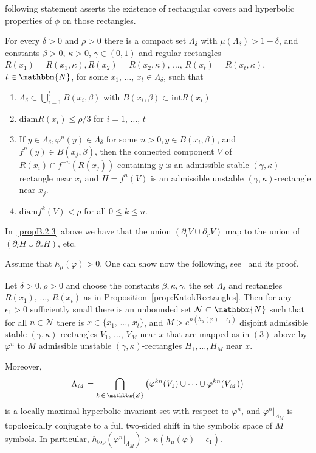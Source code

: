 \documentclass[AHL,Unicode,longabstracts,published]{cedram}
\newcommand{\N}{\mathbbm{N}}
\newcommand{\Z}{\mathbbm{Z}}
\newcommand{\topo}{\mathrm{top}}
\newcommand{\intt}{\mathrm{int}}
\newcommand{\diam}{\mathrm{diam}}
\newcommand{\clN}{\mathcal{N}}
\newcommand{\topo}{\mathrm{top}}
\begin{document}
following statement asserts the existence of rectangular covers and hyperbolic properties of $\phi$ on those rectangles.

\begin{prop}\label{prop:KatokRectangles}
For every $\delta>0$ and $\rho>0$ there is a compact set $\Lambda_{\delta}$ with $\mu(\Lambda_{\delta})>1-\delta$, and constants $\beta>0$, $\kappa>0$, $\gamma\in (0,1)$ and regular rectangles $R(x_1) = R(x_1,\kappa), R(x_2) = R(x_2,\kappa), \,\ldots,\, R(x_t)= R(x_t,\kappa)$, $t\in \N$, for some $x_1, \,\ldots,\, x_t \in \Lambda_{\delta}$, such that
\begin{enumerate}
\item\label{propB.2.1} $\Lambda_{\delta} \subset \bigcup_{i=1}^t B(x_i, \beta)$ with $B(x_i, \beta) \subset {\intt}R(x_i)$
\item \label{propB.2.2}${\diam}R(x_i) \leq \rho/3$ for $i=1, \,\ldots,\, t$
\item\label{propB.2.3} If $y\in \Lambda_{\delta}, \varphi^n(y) \in \Lambda_{\delta}$ for some $n>0, y \in B(x_i, \beta)$, and $f^n(y) \in B(x_j, \beta)$, then the connected component $V$ of $R(x_i)\cap f^{-n}(R(x_j))$ containing $y$ is an admissible stable $(\gamma, \kappa)$-rectangle near $x_i$ and $H= f^n(V)$ is an admissible unstable $(\gamma, \kappa)$-rectangle near $x_j$.
\item\label{propB.2.4} $\diam f^k(V) < \rho$ for all $0\leq k \leq n$.
\end{enumerate}
\end{prop}

In~\eqref{propB.2.3} above we have that the union $(\partial_l V \cup \partial_r V)$ map to the union of $(\partial_l H \cup \partial_r H)$, etc.

Assume that $h_{\mu}(\varphi)>0$. One can show now the following, see~\cite[Theorem~S.5.9]{Hasselblatt-Katok} and its proof.

\begin{prop}\label{prop:KatokHorseshoe}
Let $\delta>0, \rho>0$ and choose the constants $\beta, \kappa, \gamma$, the set $\Lambda_{\delta}$ and rectangles $R(x_1),\, \ldots,\, R(x_t)$ as in Proposition~\ref{prop:KatokRectangles}. Then for any $\epsilon_1>0$ sufficiently small there is an unbounded set $\clN \subset \N$ such that for all $n\in \clN$ there is $x \in \{x_1, \,\ldots,\, x_t\}$, and $M > e^{n(h_{\mu}(\varphi) - \epsilon_1)}$ disjoint admissible stable $(\gamma,\kappa)$-rectangles $V_1, \,\ldots,\, V_M$ near $x$ that are mapped as in $(3)$ above by $\varphi^n$ to $M$ admissible unstable $(\gamma,\kappa)$-rectangles $H_1, \ldots, H_M$ near $x$.

Moreover,
\[
\Lambda_M =\bigcap_{k\, \in\, \Z} \left(\varphi^{kn}(V_1) \cup \cdots \cup \varphi^{kn}(V_{M})\right)
\]
is a locally maximal hyperbolic invariant set with respect to $\varphi^n$, and $\varphi^n|_{\Lambda_M}$ is topologically conjugate to a full two-sided shift in the symbolic space of $M$ symbols. In particular, $h_{\topo}(\varphi^n|_{\Lambda_M}) > n(h_{\mu}(\varphi) - \epsilon_1)$.
\end{prop}
\end{document}
